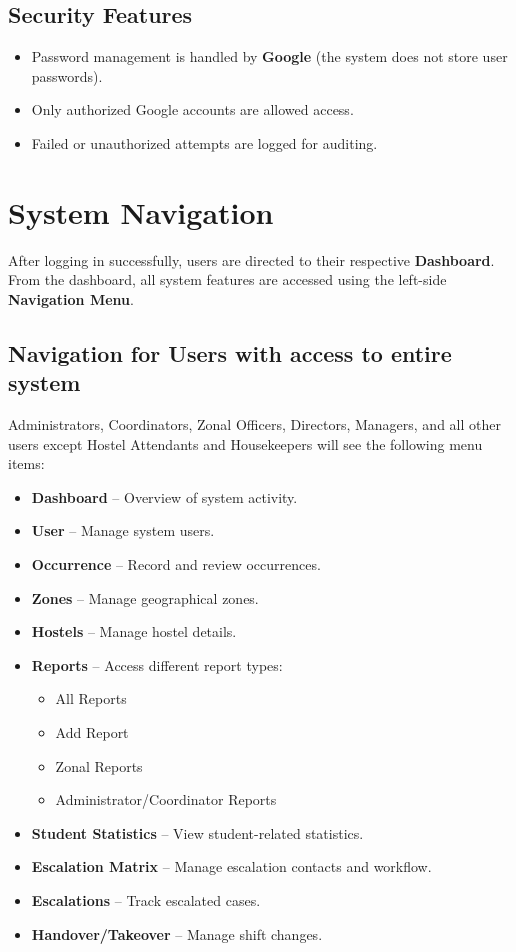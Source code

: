 \documentclass{report}
\begin{document}
	\section*{Security Features}
	\begin{itemize}
		\item Password management is handled by \textbf{Google} (the system does not store user passwords).  
		\item Only authorized Google accounts are allowed access.  
		\item Failed or unauthorized attempts are logged for auditing.  
	\end{itemize}
	
	
	\chapter{System Navigation}
	
	After logging in successfully, users are directed to their respective \textbf{Dashboard}.  
	From the dashboard, all system features are accessed using the left-side \textbf{Navigation Menu}.  
	
	\section*{Navigation for Users with access to entire system}
	Administrators, Coordinators, Zonal Officers, Directors, Managers, and all other users except Hostel Attendants and Housekeepers will see the following menu items:
	
	\begin{itemize}
		\item \textbf{Dashboard} -- Overview of system activity.  
		\item \textbf{User} -- Manage system users.  
		\item \textbf{Occurrence} -- Record and review occurrences.  
		\item \textbf{Zones} -- Manage geographical zones.  
		\item \textbf{Hostels} -- Manage hostel details.  
		\item \textbf{Reports} -- Access different report types:  
		\begin{itemize}
			\item All Reports  
			\item Add Report  
			\item Zonal Reports  
			\item Administrator/Coordinator Reports  
		\end{itemize}
		\item \textbf{Student Statistics} -- View student-related statistics.  
		\item \textbf{Escalation Matrix} -- Manage escalation contacts and workflow.  
		\item \textbf{Escalations} -- Track escalated cases.  
		\item \textbf{Handover/Takeover} -- Manage shift changes.  
	\end{itemize}
	
\end{document}
